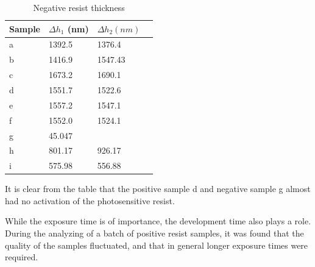 \begin{table}[H]
    \centering
    \caption{Negative resist thickness}
    \begin{tabular}{X l l l}
        Sample & $\Delta h_1$ (nm) & $\Delta h_2 (nm)$ \\ 
        \hline\hline
        a & 1392.5  &   1376.4  \\
        b & 1416.9  &   1547.43 \\
        c & 1673.2  &   1690.1  \\
        d & 1551.7  &   1522.6  \\
        e & 1557.2  &   1547.1  \\
        f & 1552.0  &   1524.1  \\
        g & 45.047  &   ~       \\
        h & 801.17  &   926.17  \\
        i & 575.98  &   556.88  \\
        \hline
    \end{tabular}
    \label{tab:neg_profile}
\end{table}

It is clear from the table that the positive sample d and negative sample g almost had no activation of the photosensitive resist.

While the exposure time is of importance, the development time also plays a role. During the analyzing of a batch of positive resist samples, it was found that the quality of the samples fluctuated, and that in general longer exposure times were required. 
